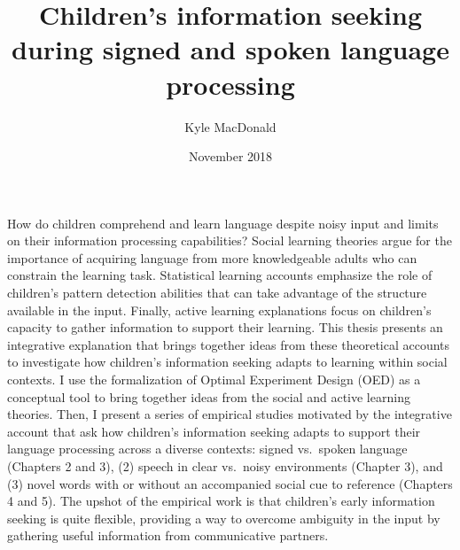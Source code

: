 \documentclass[oneside]{report}
\begin{document}
\title{Children's information seeking during signed and spoken language
processing}
\author{Kyle MacDonald}
\date{November 2018}


\makeatletter
\def\maxwidth{ %
  \ifdim\Gin@nat@width>\linewidth
    \linewidth
  \else
    \Gin@nat@width
  \fi
}
\makeatother

\renewcommand{\contentsname}{Contents}

\setlength{\parskip}{0pt}


\providecommand{\tightlist}{%
  \setlength{\itemsep}{0pt}\setlength{\parskip}{0pt}}




\beforepreface
{}
How do children comprehend and learn language despite noisy input and
limits on their information processing capabilities? Social learning
theories argue for the importance of acquiring language from more
knowledgeable adults who can constrain the learning task. Statistical
learning accounts emphasize the role of children's pattern detection
abilities that can take advantage of the structure available in the
input. Finally, active learning explanations focus on children's
capacity to gather information to support their learning. This thesis
presents an integrative explanation that brings together ideas from
these theoretical accounts to investigate how children's information
seeking adapts to learning within social contexts. I use the
formalization of Optimal Experiment Design (OED) as a conceptual tool to
bring together ideas from the social and active learning theories. Then,
I present a series of empirical studies motivated by the integrative
account that ask how children's information seeking adapts to support
their language processing across a diverse contexts: signed vs.~spoken
language (Chapters 2 and 3), (2) speech in clear vs.~noisy environments
(Chapter 3), and (3) novel words with or without an accompanied social
cue to reference (Chapters 4 and 5). The upshot of the empirical work is
that children's early information seeking is quite flexible, providing a
way to overcome ambiguity in the input by gathering useful information
from communicative partners.
\end{document}
